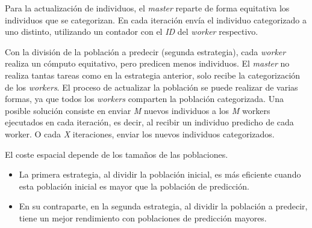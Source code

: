 		Para la actualización de individuos, el \textit{master} reparte de forma equitativa los individuos que se categorizan. En cada iteración envía el individuo categorizado a uno distinto, utilizando un contador con el \textit{ID} del \textit{worker} respectivo.
		
		Con la división de la población a predecir (segunda estrategia), cada \textit{worker} realiza un cómputo equitativo, pero predicen menos individuos. El \textit{master} no realiza tantas tareas como en la estrategia anterior, solo recibe la categorización de los \textit{workers}. El proceso de actualizar la población se puede realizar de varias formas, ya que todos los \textit{workers} comparten la población categorizada. Una posible solución consiste en enviar \textit{M} nuevos individuos a los \textit{M} workers ejecutados en cada iteración, es decir, al recibir un individuo predicho de cada worker. O cada \textit{X} iteraciones, enviar los nuevos individuos categorizados.
		
		\vspace{-0.25cm}
		\begin{flushleft}
			El coste espacial depende de los tamaños de las poblaciones.		
		\end{flushleft}
		\vspace{-0.75cm}
		
		\begin{itemize}
			\item La primera estrategia, al dividir la población inicial, es más eficiente cuando esta población inicial es mayor que la población de predicción. 
			\item En su contraparte, en la segunda estrategia, al dividir la población a predecir, tiene un mejor rendimiento con poblaciones de predicción mayores.
		\end{itemize}
		
